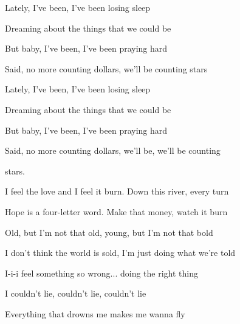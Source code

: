 \begin{song}
\begin{chorusbox}{\Chorus}
Lately, I've been, I've been losing sleep \par
{} Dreaming about the things that we could be \par
But baby, I've been, I've been praying hard \par
{} Said, no more counting dollars, we'll be counting stars \par

\bigskip

Lately, I've been, I've been losing sleep \par
{} Dreaming about the things that we could be \par
But baby, I've been, I've been praying hard \par
{} Said, no more counting dollars, we'll be, we'll be counting \par
\end{chorusbox}

\bigskip

stars.    \par

\bigskip

I feel the love and I feel it burn. Down this river, every turn \par
{}Hope is a four-letter word. Make that money, watch it burn \par
{}Old, but I'm not that old, young, but I'm not that bold \par
{}I don't think the world is sold, I'm just doing what we're told \par

\bigskip

 I-i-i feel something so wrong... doing the right thing \par
{} I couldn't lie, couldn't lie, couldn't lie \par
{}Everything that drowns me makes me wanna fly \par

\bigskip

\Chorus

\bigskip



\end{song}
